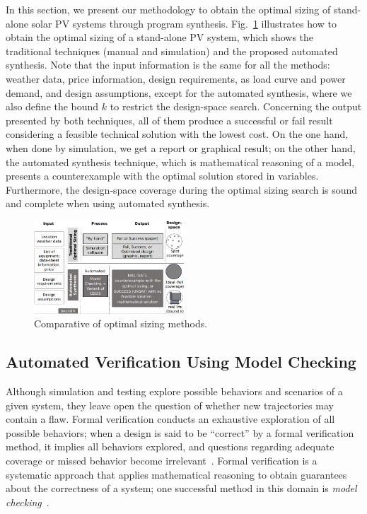 \documentclass[journal]{IEEEtran}
\begin{document}
In this section, we present our methodology to obtain the optimal sizing of stand-alone solar PV systems through program synthesis. Fig.~\ref{fig:optimization} illustrates how to obtain the optimal sizing of a stand-alone PV system, which shows the traditional techniques (manual and simulation) and the proposed automated synthesis. Note that the input information is the same for all the methods: weather data, price information, design requirements, as load curve and power demand, and design assumptions, except for the automated synthesis, where we also define the bound $k$ to restrict the design-space search. Concerning the output presented by both techniques, all of them produce a successful or fail result considering a feasible technical solution with the lowest cost. On the one hand, when done by simulation, we get a report or graphical result; on the other hand, the automated synthesis technique, which is mathematical reasoning of a model, presents a counterexample with the optimal solution stored in variables. Furthermore, the design-space coverage during the optimal sizing search is sound and complete when using automated synthesis.
%
\begin{figure}[h]
\hspace*{-1cm}\includegraphics[width=0.5\textwidth]{optimalsizingprocess4}
\centering
\caption{Comparative of optimal sizing methods.}
\label{fig:optimization}
\end{figure}

\subsection{Automated Verification Using Model Checking}
\label{sec:AutomatedVerification}

Although simulation and testing explore possible behaviors and scenarios of a given system, they leave open the question of whether new trajectories may contain a flaw. Formal verification conducts an exhaustive exploration of all possible behaviors; when a design is said to be ``correct'' by a formal verification method, it implies all behaviors explored, and questions regarding adequate coverage or missed behavior become irrelevant~\cite{Clarke2012}. Formal verification is a systematic approach that applies mathematical reasoning to obtain guarantees about the correctness of a system; one successful method in this domain is \textit{model checking}~\cite{Clarke2012}. 
\end{document}
